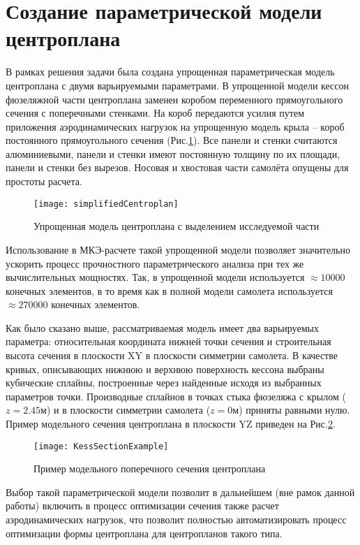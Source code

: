\section{Создание параметрической модели центроплана}
\label{sec:creationOfModel}

В рамках решения задачи была создана упрощенная параметрическая модель центроплана с двумя варьируемыми  параметрами. В упрощенной модели кессон фюзеляжной части центроплана заменен коробом переменного прямоугольного сечения с поперечными стенками. На короб передаются усилия путем приложения аэродинамических нагрузок на упрощенную модель крыла -- короб постоянного прямоугольного сечения (Рис.\ref{fig:CurvedKessonPatran}). Все панели и стенки считаются алюминиевыми, панели и стенки имеют постоянную толщину по их площади, панели и стенки без вырезов. Носовая и хвостовая части самолёта опущены для простоты расчета.  



\begin{figure}[ht]
\centering
\texttt{[image: simplifiedCentroplan]}
\caption{Упрощенная модель центроплана с выделением исследуемой части}
\label{fig:CurvedKessonPatran}
\end{figure}

Использование в МКЭ-расчете такой упрощенной модели позволяет значительно ускорить процесс прочностного параметрического анализа при тех же вычислительных мощностях. Так, в упрощенной модели используется $\approx10000$ конечных элементов, в то время как в полной модели самолета используется $\approx270000$ конечных элементов.

Как было сказано выше, рассматриваемая модель имеет два варьируемых параметра: относительная координата нижней точки сечения и строительная высота сечения в плоскости XY в плоскости симметрии самолета. В качестве кривых, описывающих нижнюю и верхнюю поверхность кессона выбраны кубические сплайны, построенные через найденные исходя из выбранных параметров точки. Производные сплайнов в точках стыка фюзеляжа с крылом ($z=2.45\text{м}$) и в плоскости симметрии самолета ($z=0\text{м}$) приняты равными нулю. Пример модельного сечения центроплана в плоскости YZ приведен на Рис.\ref{fig:KessSectionExample}.

\begin{figure}[ht]
\centering
\texttt{[image: KessSectionExample]}
%
\caption{Пример модельного поперечного сечения центроплана}
\label{fig:KessSectionExample}
\end{figure}


Выбор такой параметрической модели позволит в дальнейшем (вне рамок данной работы) включить в процесс оптимизации сечения также расчет аэродинамических нагрузок, что позволит полностью автоматизировать процесс оптимизации формы центроплана для центропланов такого типа. 

